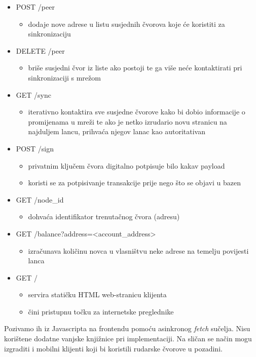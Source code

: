 \documentclass[utf8, zavrsni]{fer}
\begin{document}
\begin{itemize}
\begin{itemize}
	\end{itemize}
	\item POST   /peer
	\begin{itemize}
		\item dodaje nove adrese u listu susjednih čvorova koje će koristiti za sinkronizaciju
	\end{itemize}
	\item DELETE /peer
	\begin{itemize}
		\item briše susjedni čvor iz liste ako postoji te ga više neće kontaktirati pri sinkronizaciji s mrežom
	\end{itemize}
	\item GET    /sync
	\begin{itemize}
		\item iterativno kontaktira sve susjedne čvorove kako bi dobio informacije o promijenama u mreži te ako je netko izrudario novu stranicu na najduljem lancu, prihvaća njegov lanac kao autoritativan
	\end{itemize}
	\item POST   /sign
	\begin{itemize}
		\item privatnim ključem čvora digitalno potpisuje bilo kakav payload
		\item koristi se za potpisivanje transakcije prije nego što se objavi u bazen
	\end{itemize}
	\item GET    /node\_id
	\begin{itemize}
		\item dohvaća identifikator trenutačnog čvora (adresu)
	\end{itemize}
	\item GET    /balance?address=<account\_address>
	\begin{itemize}
		\item izračunava količinu novca u vlasništvu neke adrese na temelju povijesti lanca
	\end{itemize}
	\item GET    /
	\begin{itemize}
		\item servira statičku HTML web-stranicu klijenta
		\item čini pristupnu točku za internetske preglednike
	\end{itemize}
\end{itemize}

Pozivamo ih iz Javascripta na frontendu pomoću asinkronog \textit{fetch} sučelja. Nisu korištene dodatne vanjske knjižnice pri implementaciji. Na sličan se način mogu izgraditi i mobilni klijenti koji bi koristili rudarske čvorove u pozadini.
\end{document}
